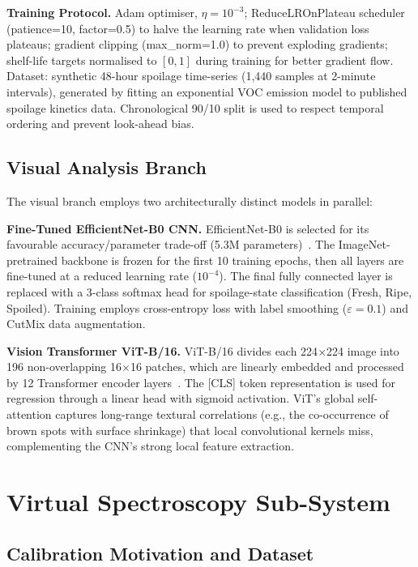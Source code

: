 \documentclass{ieeeaccess}
\begin{document}
\textbf{Training Protocol.} Adam optimiser, $\eta = 10^{-3}$; ReduceLROnPlateau scheduler (patience=10, factor=0.5) to halve the learning rate when validation loss plateaus; gradient clipping (max\_norm=1.0) to prevent exploding gradients; shelf-life targets normalised to $[0,1]$ during training for better gradient flow. Dataset: synthetic 48-hour spoilage time-series (1,440 samples at 2-minute intervals), generated by fitting an exponential VOC emission model to published spoilage kinetics data. Chronological 90/10 split is used to respect temporal ordering and prevent look-ahead bias.

\subsection{Visual Analysis Branch}

The visual branch employs two architecturally distinct models in parallel:

\textbf{Fine-Tuned EfficientNet-B0 CNN.} EfficientNet-B0 is selected for its favourable accuracy/parameter trade-off (5.3M parameters)~\cite{Amin2023}. The ImageNet-pretrained backbone is frozen for the first 10 training epochs, then all layers are fine-tuned at a reduced learning rate ($10^{-4}$). The final fully connected layer is replaced with a 3-class softmax head for spoilage-state classification (Fresh, Ripe, Spoiled). Training employs cross-entropy loss with label smoothing ($\varepsilon=0.1$) and CutMix data augmentation.

\textbf{Vision Transformer ViT-B/16.} ViT-B/16 divides each 224$\times$224 image into 196 non-overlapping 16$\times$16 patches, which are linearly embedded and processed by 12 Transformer encoder layers~\cite{Gao2024}. The [CLS] token representation is used for regression through a linear head with sigmoid activation. ViT's global self-attention captures long-range textural correlations (e.g., the co-occurrence of brown spots with surface shrinkage) that local convolutional kernels miss, complementing the CNN's strong local feature extraction.

\section{Virtual Spectroscopy Sub-System}
\label{sec:spectroscopy}

\subsection{Calibration Motivation and Dataset}
\end{document}
